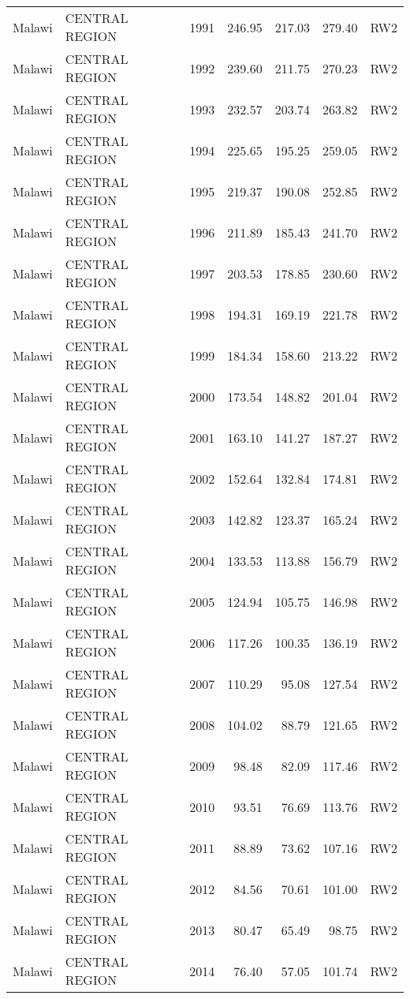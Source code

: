 \begin{longtable}{lllrrrl}
  Malawi & CENTRAL REGION & 1991 & 246.95 & 217.03 & 279.40 & RW2 \\ 
  Malawi & CENTRAL REGION & 1992 & 239.60 & 211.75 & 270.23 & RW2 \\ 
  Malawi & CENTRAL REGION & 1993 & 232.57 & 203.74 & 263.82 & RW2 \\ 
  Malawi & CENTRAL REGION & 1994 & 225.65 & 195.25 & 259.05 & RW2 \\ 
  Malawi & CENTRAL REGION & 1995 & 219.37 & 190.08 & 252.85 & RW2 \\ 
  Malawi & CENTRAL REGION & 1996 & 211.89 & 185.43 & 241.70 & RW2 \\ 
  Malawi & CENTRAL REGION & 1997 & 203.53 & 178.85 & 230.60 & RW2 \\ 
  Malawi & CENTRAL REGION & 1998 & 194.31 & 169.19 & 221.78 & RW2 \\ 
  Malawi & CENTRAL REGION & 1999 & 184.34 & 158.60 & 213.22 & RW2 \\ 
  Malawi & CENTRAL REGION & 2000 & 173.54 & 148.82 & 201.04 & RW2 \\ 
  Malawi & CENTRAL REGION & 2001 & 163.10 & 141.27 & 187.27 & RW2 \\ 
  Malawi & CENTRAL REGION & 2002 & 152.64 & 132.84 & 174.81 & RW2 \\ 
  Malawi & CENTRAL REGION & 2003 & 142.82 & 123.37 & 165.24 & RW2 \\ 
  Malawi & CENTRAL REGION & 2004 & 133.53 & 113.88 & 156.79 & RW2 \\ 
  Malawi & CENTRAL REGION & 2005 & 124.94 & 105.75 & 146.98 & RW2 \\ 
  Malawi & CENTRAL REGION & 2006 & 117.26 & 100.35 & 136.19 & RW2 \\ 
  Malawi & CENTRAL REGION & 2007 & 110.29 & 95.08 & 127.54 & RW2 \\ 
  Malawi & CENTRAL REGION & 2008 & 104.02 & 88.79 & 121.65 & RW2 \\ 
  Malawi & CENTRAL REGION & 2009 & 98.48 & 82.09 & 117.46 & RW2 \\ 
  Malawi & CENTRAL REGION & 2010 & 93.51 & 76.69 & 113.76 & RW2 \\ 
  Malawi & CENTRAL REGION & 2011 & 88.89 & 73.62 & 107.16 & RW2 \\ 
  Malawi & CENTRAL REGION & 2012 & 84.56 & 70.61 & 101.00 & RW2 \\ 
  Malawi & CENTRAL REGION & 2013 & 80.47 & 65.49 & 98.75 & RW2 \\ 
  Malawi & CENTRAL REGION & 2014 & 76.40 & 57.05 & 101.74 & RW2 \\ 

\end{longtable}
